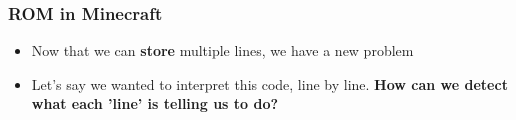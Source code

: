 \documentclass{beamer}
\begin{document}
             \begin{frame}
             	\frametitle{ROM in Minecraft}
             	\begin{itemize}
             		\item Now that we can \textbf{store} multiple lines, we have a new problem
             		\item Let's say we wanted to interpret this code, line by line. \textbf{How can we detect what each 'line' is telling us to do?}
             	\end{itemize}

				{
				\centering
				


\begin{tikzpicture}[x=0.75pt,y=0.75pt,yscale=-1,xscale=1]


\end{tikzpicture}}
\end{frame}
\end{document}
